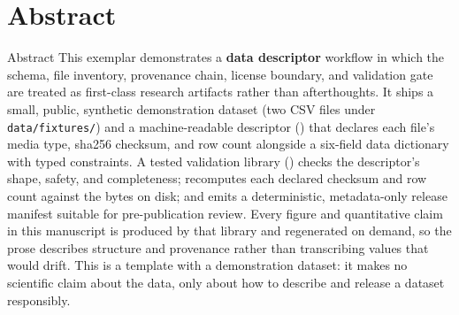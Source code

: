 \documentclass[
  ignorenonframetext,
]{beamer}
\author{\texorpdfstring{}{}}
\date{}
\begin{document}
\section{Abstract}\label{abstract}

\begin{frame}{Abstract}
This exemplar demonstrates a \textbf{data descriptor} workflow in which
the schema, file inventory, provenance chain, license boundary, and
validation gate are treated as first-class research artifacts rather
than afterthoughts. It ships a small, public, synthetic demonstration
dataset (two CSV files under \texttt{data/fixtures/}) and a
machine-readable descriptor ()
that declares each file's media type, sha256 checksum, and row count
alongside a six-field data dictionary with typed constraints. A tested
validation library () checks the
descriptor's shape, safety, and completeness; recomputes each declared
checksum and row count against the bytes on disk; and emits a
deterministic, metadata-only release manifest suitable for
pre-publication review. Every figure and quantitative claim in this
manuscript is produced by that library and regenerated on demand, so the
prose describes structure and provenance rather than transcribing values
that would drift. This is a template with a demonstration dataset: it
makes no scientific claim about the data, only about how to describe and
release a dataset responsibly.
\end{frame}
\end{document}
